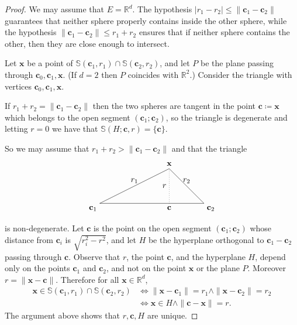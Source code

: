 \documentclass[12pt]{amsart}
\newcommand{\R}{\mathbb{R}}	%
\newcommand{\IFF}{\Leftrightarrow}
\newcommand{\set}[1]{\mathopen \{ {#1} \mathclose \}} %
\newcommand{\card}[1]{\mathopen | #1 \mathclose |}		%
\theoremstyle{plain}
\theoremstyle{definition}
\theoremstyle{remark}
\begin{document}
\begin{proof}
We may assume that \( E = \R^d \).
The hypothesis \( \card{ r_1 - r_2 } \leq \| \mathbf{c}_1 - \mathbf{c}_2 \| \) guarantees that neither sphere properly contains inside the other sphere, while the hypothesis \( \| \mathbf{c}_1 - \mathbf{c}_2 \| \leq r_1 + r_2 \) ensures that if neither sphere contains the other, then they are close enough to intersect.

Let \( \mathbf{x} \) be a point of \( \mathbb{S} ( \mathbf{c}_1 , r_1 ) \cap \mathbb{S} ( \mathbf{c}_2 , r_2 ) \), and let \( P \) be the plane passing through \( \mathbf{c}_0 , \mathbf{c}_1 , \mathbf{x} \).
(If \( d = 2 \) then \( P \) coincides with \( \R^2 \).)
Consider the triangle with vertices \( \mathbf{c}_0 , \mathbf{c}_1 , \mathbf{x} \).

If \( r_1 + r_2 = \| \mathbf{c}_1 - \mathbf{c}_2 \| \) then the two spheres are tangent in the point \( \mathbf{c} \coloneqq \mathbf{x} \) which belongs to the open segment \( ( \mathbf{c}_1 ; \mathbf{c}_2 ) \), so the triangle is degenerate and letting \( r = 0 \) we have that \( \mathbb{S} ( H ; \mathbf{c} , r ) = \set{\mathbf{c} } \).

So we may assume that \( r_1 + r_2 > \| \mathbf{c}_1 - \mathbf{c}_2 \| \) and that the triangle 
\[
\begin{tikzpicture}[scale=1.5]
\node (c1) at (0,0) [anchor=north east] {\( \mathbf{c}_1 \)};
\node (c2) at (3,0) [anchor= north west] {\( \mathbf{c}_2 \)};
\node (x) at (2,1) [anchor= south ] {\( \mathbf{x} \)};
\node (c) at (2,0) [anchor= north ] {\( \mathbf{c} \)};
\draw[-] (0,0) -- (3,0)--(2,1)--cycle;
\draw [-, dotted] (2,0)--(2,1);
\node at (1, 0.5) [anchor=south]{\( r_1 \)};
\node at (2.5, 0.5) [anchor=south]{\( r_2 \)};
\node at (2, 0.5) [anchor=east]{\( r \)};
\end{tikzpicture}
\]
is non-degenerate.
Let \( \mathbf{c} \) is the point on the open segment \( ( \mathbf{c}_1 ; \mathbf{c}_2 ) \) whose distance from \( \mathbf{c}_i \) is \( \sqrt{r_i^2 - r^2} \), and let \( H \) be the hyperplane orthogonal to \( \mathbf{c}_1 - \mathbf{c}_2 \) passing through \( \mathbf{c} \).
Observe that \( r \), the point \( \mathbf{c} \), and the hyperplane \( H \), depend only on the points \( \mathbf{c}_1 \) and \( \mathbf{c}_2 \), and not on the point \( \mathbf{x} \) or the plane \( P \).
Moreover \( r = \| \mathbf{x} - \mathbf{c} \| \).
Therefore for all \( \mathbf{x} \in \R^d \),
\[
\begin{split}
\mathbf{x} \in \mathbb{S} ( \mathbf{c}_1 , r_1 ) \cap \mathbb{S} ( \mathbf{c}_2 , r_2 ) & \IFF \| \mathbf{x} - \mathbf{c}_1 \| = r_1 \wedge \| \mathbf{x} - \mathbf{c}_2 \| = r_2
\\
 & \IFF \mathbf{x} \in H \wedge \| \mathbf{c} - \mathbf{x} \| = r .
\end{split}
\]
The argument above shows that \( r , \mathbf{c} , H \) are unique.
\end{proof}
\end{document}
